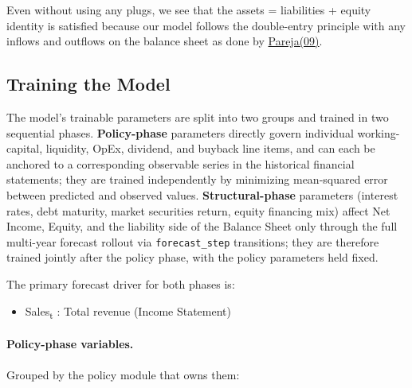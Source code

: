 \documentclass[12pt,a4paper]{article}
\begin{document}
Even without using any plugs, we see that the assets = liabilities +
equity identity is satisfied because our model follows the double-entry
principle with any inflows and outflows on the balance sheet as done by
\hyperlink{ref:pareja09}{Pareja(09)}.

\subsection{Training the Model}

The model's trainable parameters are split into two groups and trained
in two sequential phases. \textbf{Policy-phase} parameters directly
govern individual working-capital, liquidity, OpEx, dividend, and
buyback line items, and can each be anchored to a corresponding
observable series in the historical financial statements; they are
trained independently by minimizing mean-squared error between
predicted and observed values. \textbf{Structural-phase} parameters
(interest rates, debt maturity, market securities return, equity
financing mix) affect Net Income, Equity, and the liability side of
the Balance Sheet only through the full multi-year forecast rollout
via \texttt{forecast\_step} transitions; they are therefore trained
jointly after the policy phase, with the policy parameters held fixed.

The primary forecast driver for both phases is:

\begin{itemize}
\item Sales\textsubscript{t} : Total revenue (Income Statement)
\end{itemize}

\paragraph{Policy-phase variables.}
Grouped by the policy module that owns them:
\end{document}
